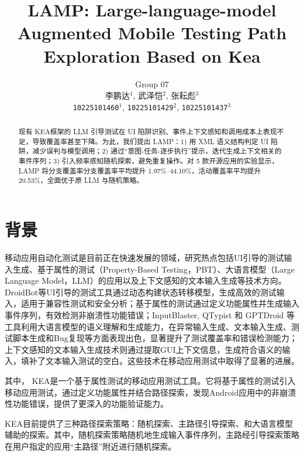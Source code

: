 \documentclass[twocolumn, 10pt]{article}
\title{\fontspec{Times New Roman} LAMP: Large-language-model Augmented Mobile Testing Path Exploration Based on Kea}
\author{
  Group 07\\
  李鹏达$^{1}$, 武泽恺$^{2}$, 张耘彪$^{3}$\\
  \texttt{10225101460}$^{1}$, 
  \texttt{10225101429}$^{2}$, 
  \texttt{10225101437}$^{3}$
}
\date{}
\newcommand{\figureBelowMargin}{\vspace{-2pt}}
\newcommand{\kea}{K{\small\MakeUppercase{ea}}}
\newcommand{\lamp}{L{\small\MakeUppercase{amp}}}
\begin{document}
\maketitle

\begin{abstract}
现有 \kea 框架的 LLM 引导测试在 UI 陷阱识别、事件上下文感知和调用成本上表现不足，导致覆盖率甚至下降。为此，我们提出 \lamp：1) 用 XML 语义结构判定 UI 陷阱，减少误判与模型调用；2) 通过“意图-任务-逐步执行”提示，迭代生成上下文相关的事件序列；3) 引入频率感知随机探索，避免重复操作。对 5 款开源应用的实验显示，LAMP 将分支覆盖率分支覆盖率平均提升 1.97\%–44.10\%，活动覆盖率平均提升20.53\%，全面优于原 LLM 与随机策略。
\end{abstract}

\section{背景}

移动应用自动化测试是目前正在快速发展的领域，研究热点包括UI引导的测试输入生成、基于属性的测试（Property-Based Testing，PBT）、大语言模型（Large Language Model，LLM）的应用以及上下文感知的文本输入生成等技术方向。DroidBot\cite{li2017droidbot}等UI引导的测试工具通过动态构建状态转移模型，生成高效的测试输入，适用于兼容性测试和安全分析；基于属性的测试\cite{xiong2024general}通过定义功能属性并生成输入事件序列，有效检测非崩溃性功能错误；InputBlaster\cite{liu2024testing}, QTypist\cite{liu2023fill} 和 GPTDroid\cite{liu2024make} 等工具利用大语言模型的语义理解和生成能力，在异常输入生成、文本输入生成、测试脚本生成和Bug复现等方面表现出色，显著提升了测试覆盖率和错误检测能力；上下文感知的文本输入生成技术\cite{liu2023fill}则通过提取GUI上下文信息，生成符合语义的输入，填补了文本输入测试的空白。这些技术在移动应用测试中取得了显著的进展。

其中， \kea\cite{xiong2024general}是一个基于属性测试的移动应用测试工具。它将基于属性的测试引入移动应用测试，通过定义功能属性并结合路径探索，发现Android应用中的非崩溃性功能错误，提供了更深入的功能验证能力。


\kea 目前提供了三种路径探索策略：随机探索、主路径引导探索、和大语言模型辅助的探索。其中，随机探索策略随机地生成输入事件序列，主路经引导探索策略在用户指定的应用``主路径''附近进行随机探索。
\end{document}

